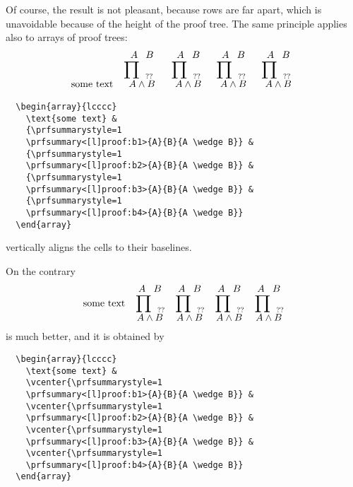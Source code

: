 \documentclass{amsart}
\begin{document}
Of course, the result is not pleasant, because rows are far apart,
which is unavoidable because of the height of the proof tree.  The
same principle applies also to arrays of proof trees:
\begin{displaymath}
  \begin{array}{lcccc}
    \text{some text} &
    \setcounter{prfsummarycounter}{0}
    \setcounter{prfassumptioncounter}{0}
    {\prfsummarystyle=1
    \prfsummary<[l]proof:b1>{A}{B}{A \wedge B}} &
    {\prfsummarystyle=1
    \prfsummary<[l]proof:b2>{A}{B}{A \wedge B}} &
    {\prfsummarystyle=1
    \prfsummary<[l]proof:b3>{A}{B}{A \wedge B}} &
    {\prfsummarystyle=1
    \prfsummary<[l]proof:b4>{A}{B}{A \wedge B}}
  \end{array}
\end{displaymath}
\begin{verbatim}
  \begin{array}{lcccc}
    \text{some text} &
    {\prfsummarystyle=1
    \prfsummary<[l]proof:b1>{A}{B}{A \wedge B}} &
    {\prfsummarystyle=1
    \prfsummary<[l]proof:b2>{A}{B}{A \wedge B}} &
    {\prfsummarystyle=1
    \prfsummary<[l]proof:b3>{A}{B}{A \wedge B}} &
    {\prfsummarystyle=1
    \prfsummary<[l]proof:b4>{A}{B}{A \wedge B}}
  \end{array}
\end{verbatim}
vertically aligns the cells to their baselines.

On the contrary
\begin{displaymath}
  \begin{array}{lcccc}
    \text{some text} &
    \setcounter{prfsummarycounter}{0}
    \setcounter{prfassumptioncounter}{0}
    \vcenter{\prfsummarystyle=1
    \prfsummary<[l]proof:b1>{A}{B}{A \wedge B}} &
    \vcenter{\prfsummarystyle=1
    \prfsummary<[l]proof:b2>{A}{B}{A \wedge B}} &
    \vcenter{\prfsummarystyle=1
    \prfsummary<[l]proof:b3>{A}{B}{A \wedge B}} &
    \vcenter{\prfsummarystyle=1
    \prfsummary<[l]proof:b4>{A}{B}{A \wedge B}}
  \end{array}
\end{displaymath}
is much better, and it is obtained by
\begin{verbatim}
  \begin{array}{lcccc}
    \text{some text} &
    \vcenter{\prfsummarystyle=1
    \prfsummary<[l]proof:b1>{A}{B}{A \wedge B}} &
    \vcenter{\prfsummarystyle=1
    \prfsummary<[l]proof:b2>{A}{B}{A \wedge B}} &
    \vcenter{\prfsummarystyle=1
    \prfsummary<[l]proof:b3>{A}{B}{A \wedge B}} &
    \vcenter{\prfsummarystyle=1
    \prfsummary<[l]proof:b4>{A}{B}{A \wedge B}}
  \end{array}
\end{verbatim}\vspace{2ex}
\end{document}
